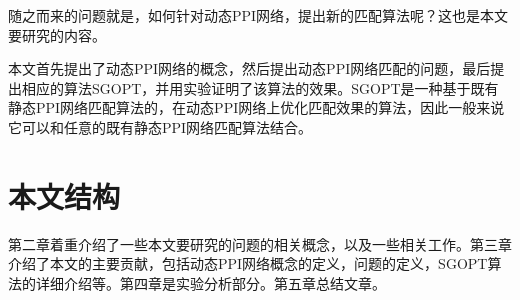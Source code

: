随之而来的问题就是，如何针对动态PPI网络，提出新的匹配算法呢？这也是本文要研究的内容。

本文首先提出了动态PPI网络的概念，然后提出动态PPI网络匹配的问题，最后提出相应的算法SGOPT，并用实验证明了该算法的效果。SGOPT是一种基于既有静态PPI网络匹配算法的，在动态PPI网络上优化匹配效果的算法，因此一般来说它可以和任意的既有静态PPI网络匹配算法结合。
\section{本文结构}

第二章着重介绍了一些本文要研究的问题的相关概念，以及一些相关工作。第三章介绍了本文的主要贡献，包括动态PPI网络概念的定义，问题的定义，SGOPT算法的详细介绍等。第四章是实验分析部分。第五章总结文章。
